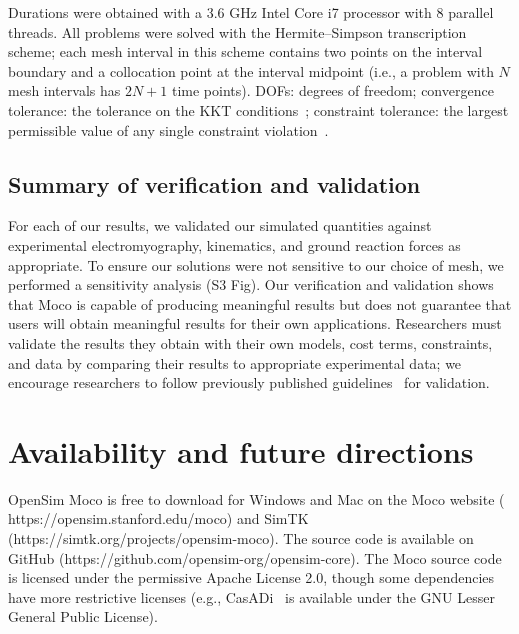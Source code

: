 \documentclass[10pt,letterpaper]{article}
\begin{document}
\begin{table}[!ht]
\begin{adjustwidth}{-2.25in}{0in}
        \begin{flushleft}
            Durations were obtained with a
            3.6 GHz Intel Core i7 processor with 8 parallel threads.
            All problems were solved with the Hermite--Simpson transcription scheme;
            each mesh interval in this scheme contains two points on the interval boundary
            and a collocation point at the interval midpoint (i.e., a problem with $N$ mesh intervals has $2N + 1$ time points). DOFs: degrees of freedom;
convergence tolerance: the tolerance on the KKT conditions~\cite{Betts:2010}; constraint tolerance: the largest permissible value of any single constraint violation~\cite{Wachter:2006}.
        \end{flushleft}
        \label{tab:durations}
    \end{adjustwidth}
\end{table}

\subsection*{Summary of verification and validation}

For each of our results, we validated our simulated quantities against experimental electromyography, kinematics, and ground reaction forces as appropriate. To ensure our solutions were not sensitive to our choice of mesh, we performed a sensitivity analysis (S3 Fig). Our verification and validation shows that Moco is capable of producing meaningful results but does not guarantee that users will obtain meaningful results for their own applications. Researchers must validate the results they obtain with their own models, cost terms, constraints, and data by comparing their results to appropriate experimental data; we encourage researchers to follow previously published guidelines~\cite{Hicks:2015bo} for validation.

\section*{Availability and future directions}

OpenSim Moco is free to download for Windows and Mac on the Moco website (\\https://opensim.stanford.edu/moco) and SimTK (https://simtk.org/projects/opensim-moco). The source code is available on GitHub (https://github.com/opensim-org/opensim-core). The Moco source code is licensed under the permissive Apache License 2.0, though some dependencies have more restrictive licenses (e.g., CasADi~\cite{Andersson:2019} is available under the GNU Lesser General Public License).
\end{document}
